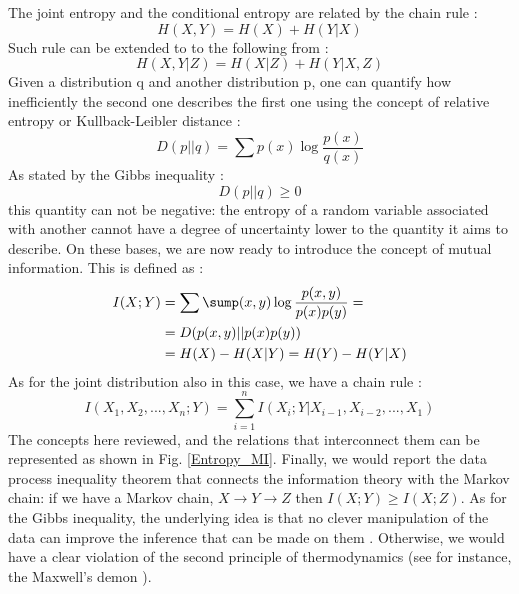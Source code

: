 \documentclass[12pt,%
               a4paper,%
               oneside,openany,%
               titlepage,%
               headinclude,footinclude,%
               BCOR5mm,%
               cleardoublepage=empty,%
               tablecaptionabove,%
               floatperchapter,
               ]{scrreprt}                 %
\begin{document}
The joint entropy and the conditional entropy are related by the chain rule \cite{cover2006elements}:
\begin{equation}
H(X,Y)=H(X)+H(Y|X)
\end{equation}
Such rule can be extended to to the following from \cite{cover2006elements}:
\begin{equation}
H(X,Y|Z)=H(X|Z)+H(Y|X,Z)
\end{equation}
Given a distribution q and another distribution p, one can quantify how inefficiently the second one describes the first one using the concept of relative entropy or Kullback-Leibler distance \cite{cover2006elements,mackay2003information}:
\begin{equation}
D(p||q)=\sum p(x)\log\frac{p(x)}{q(x)}
\end{equation}
As stated by the Gibbs inequality \cite{cover2006elements,mackay2003information}:
\begin{equation}
D(p||q)\geq 0
\end{equation}
this quantity can not be negative: the entropy of a random variable associated with another cannot have a degree of uncertainty lower to the quantity it aims to describe. On these bases, we are now ready to introduce the concept of mutual information. This is defined as  \cite{cover2006elements}:
\begin{equation}
\begin{split}
I(X;Y)&=\sum\sump(x,y)\log\dfrac{p(x,y)}{p(x)p(y)}=\\
&=D(p(x,y)||p(x)p(y)) \\
&=H(X)-H(X|Y)=H(Y)-H(Y|X)
\end{split}
\end{equation}
 As for the joint distribution also in this case, we have a chain rule  \cite{cover2006elements}:
\begin{equation}
I(X_{1},X_{2},...,X_{n};Y)=\sum^{n}_{i=1}I(X_{i};Y|X_{i-1},X_{i-2},...,X_{1})
\end{equation}
The concepts here reviewed, and the relations that interconnect them can be represented as shown in Fig. \ref{Entropy_MI}. Finally, we would report the data process inequality theorem that connects the information theory with the Markov chain: if we have a Markov chain, $X\rightarrow Y \rightarrow Z$  then $I(X;Y)\geq I(X;Z) $. As for the Gibbs inequality, the underlying idea is that no clever manipulation of the data can improve the inference that can be made on them \cite{cover2006elements,mackay2003information}. Otherwise, we would have a clear violation of the second principle of thermodynamics (see for instance, the Maxwell's demon \cite{feynman2018feynman}).
\end{document}
